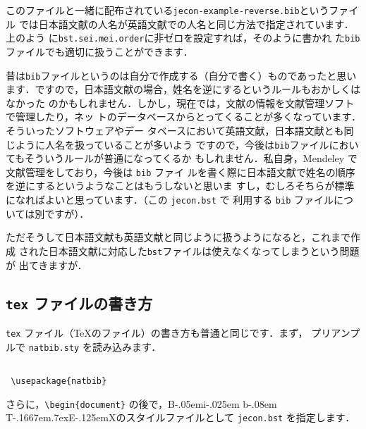 \documentclass[a4j,10pt]{jarticle}
\def\BibTeX{{\rm B\kern-.05em{\sc i\kern-.025em b}\kern-.08em
    T\kern-.1667em\lower.7ex\hbox{E}\kern-.125emX}}
\begin{document}
このファイルと一緒に配布されている\texttt{jecon-example-reverse.bib}というファイル
では日本語文献の人名が英語文献での人名と同じ方法で指定されています．上のよう
に\texttt{bst.sei.mei.order}に非ゼロを設定すれば，そのように書かれ
た\texttt{bib}ファイルでも適切に扱うことができます．

昔は\texttt{bib}ファイルというのは自分で作成する（自分で書く）ものであったと思い
ます．ですので，日本語文献の場合，姓名を逆にするというルールもおかしくはなかった
のかもしれません．しかし，現在では，文献の情報を文献管理ソフトで管理したり，ネッ
トのデータベースからとってくることが多くなっています．そういったソフトウェアやデー
タベースにおいて英語文献，日本語文献とも同じように人名を扱っていることが多いよう
ですので，今後は\texttt{bib}ファイルにおいてもそういうルールが普通になってくるか
もしれません．私自身，Mendeley で文献管理をしており，今後は \texttt{bib} ファイ
ルを書く際に日本語文献で姓名の順序を逆にするというようなことはもうしないと思いま
すし，むしろそちらが標準になればよいと思っています．（この \texttt{jecon.bst} で
利用する \texttt{bib} ファイルについては別ですが）．

ただそうして日本語文献も英語文献と同じように扱うようになると，これまで作成
された日本語文献に対応した\texttt{bst}ファイルは使えなくなってしまうという問題が
出てきますが．

\subsection{\texttt{tex} ファイルの書き方}

\texttt{tex} ファイル（\TeX のファイル）の書き方も普通と同じです．まず，
プリアンプルで \texttt{natbib.sty} を読み込みます．

\begin{screen}
 \begin{verbatim}

 \usepackage{natbib}
 \end{verbatim}
\end{screen}

さらに，\verb|\begin{document}| の後で，\BibTeX のスタイルファイルとして 
\texttt{jecon.bst} を指定します．

\begin{screen}
 \begin{verbatim}

 
 \end{verbatim}
\end{screen}
\end{document}

